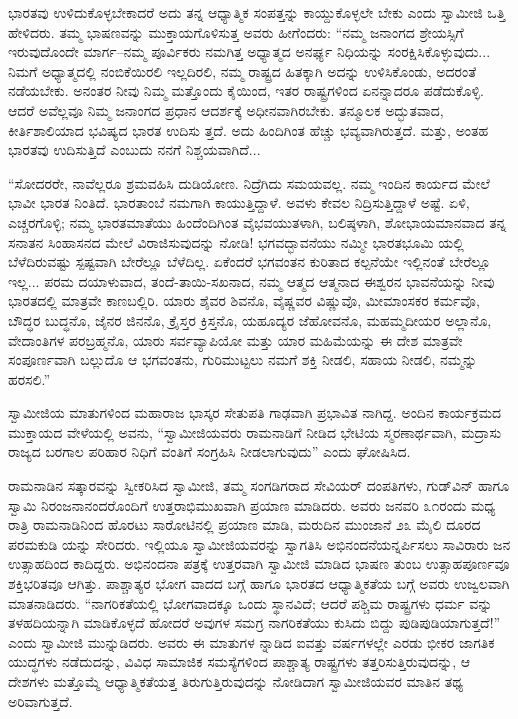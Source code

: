 ಭಾರತವು ಉಳಿದುಕೊಳ್ಳಬೇಕಾದರೆ ಅದು ತನ್ನ ಆಧ್ಯಾತ್ಮಿಕ ಸಂಪತ್ತನ್ನು ಕಾಯ್ದುಕೊಳ್ಳಲೇ ಬೇಕು ಎಂದು ಸ್ವಾಮೀಜಿ ಒತ್ತಿ ಹೇಳಿದರು. ತಮ್ಮ ಭಾಷಣವನ್ನು ಮುಕ್ತಾಯಗೊಳಿಸುತ್ತ ಅವರು ಹೀಗೆಂದರು: “ನಮ್ಮ ಜನಾಂಗದ ಶ್ರೇಯಸ್ಸಿಗೆ ಇರುವುದೊಂದೇ ಮಾರ್ಗ–ನಮ್ಮ ಪೂರ್ವಿಕರು ನಮಗಿತ್ತ ಅಧ್ಯಾತ್ಮದ ಅನರ್ಘ್ಯ ನಿಧಿಯನ್ನು ಸಂರಕ್ಷಿಸಿಕೊಳ್ಳುವುದು... ನಿಮಗೆ ಅಧ್ಯಾತ್ಮದಲ್ಲಿ ನಂಬಿಕೆಯಿರಲಿ ಇಲ್ಲದಿರಲಿ, ನಮ್ಮ ರಾಷ್ಟ್ರದ ಹಿತಕ್ಕಾಗಿ ಅದನ್ನು ಉಳಿಸಿಕೊಂಡು, ಅದರಂತೆ ನಡೆಯಬೇಕು. ಅನಂತರ ನೀವು ನಿಮ್ಮ ಮತ್ತೊಂದು ಕೈಯಿಂದ, ಇತರ ರಾಷ್ಟ್ರಗಳಿಂದ ಏನನ್ನಾದರೂ ಪಡೆದುಕೊಳ್ಳಿ. ಆದರೆ ಅವೆಲ್ಲವೂ ನಿಮ್ಮ ಜನಾಂಗದ ಪ್ರಧಾನ ಆದರ್ಶಕ್ಕೆ ಅಧೀನವಾಗಿರಬೇಕು. ತನ್ಮೂಲಕ ಅದ್ಭುತವಾದ, ಕೀರ್ತಿಶಾಲಿಯಾದ ಭವಿಷ್ಯದ ಭಾರತ ಉದಿಸು ತ್ತದೆ. ಅದು ಹಿಂದಿಗಿಂತ ಹೆಚ್ಚು ಭವ್ಯವಾಗಿರುತ್ತದೆ. ಮತ್ತು, ಅಂತಹ ಭಾರತವು ಉದಿಸುತ್ತಿದೆ ಎಂಬುದು ನನಗೆ ನಿಶ್ಚಯವಾಗಿದೆ... 

“ಸೋದರರೇ, ನಾವೆಲ್ಲರೂ ಶ್ರಮವಹಿಸಿ ದುಡಿಯೋಣ. ನಿದ್ರೆಗಿದು ಸಮಯವಲ್ಲ. ನಮ್ಮ ಇಂದಿನ ಕಾರ್ಯದ ಮೇಲೆ ಭಾವೀ ಭಾರತ ನಿಂತಿದೆ. ಭಾರತಾಂಬೆ ನಮಗಾಗಿ ಕಾಯುತ್ತಿದ್ದಾಳೆ. ಅವಳು ಕೇವಲ ನಿದ್ರಿಸುತ್ತಿದ್ದಾಳೆ ಅಷ್ಟೆ. ಏಳಿ, ಎಚ್ಚರಗೊಳ್ಳಿ; ನಮ್ಮ ಭಾರತಮಾತೆಯು ಹಿಂದೆಂದಿಗಿಂತ ವೈಭವಯುತಳಾಗಿ, ಬಲಿಷ್ಠಳಾಗಿ, ಶೋಭಾಯಮಾನವಾದ ತನ್ನ ಸನಾತನ ಸಿಂಹಾಸನದ ಮೇಲೆ ವಿರಾಜಿಸುವುದನ್ನು ನೋಡಿ! ಭಗವದ್ಭಾವನೆಯು ನಮ್ಮೀ ಭಾರತಭೂಮಿ ಯಲ್ಲಿ ಬೆಳೆದಿರುವಷ್ಟು ಸ್ಪಷ್ಟವಾಗಿ ಬೇರೆಲ್ಲೂ ಬೆಳೆದಿಲ್ಲ. ಏಕೆಂದರೆ ಭಗವಂತನ ಕುರಿತಾದ ಕಲ್ಪನೆಯೇ ಇಲ್ಲಿನಂತೆ ಬೇರೆಲ್ಲೂ ಇಲ್ಲ... ಪರಮ ದಯಾಳುವಾದ, ತಂದೆ-ತಾಯಿ-ಸಖನಾದ, ನಮ್ಮ ಆತ್ಮದ ಆತ್ಮನಾದ ಈಶ್ವರನ ಭಾವನೆಯನ್ನು ನೀವು ಭಾರತದಲ್ಲಿ ಮಾತ್ರವೇ ಕಾಣಬಲ್ಲಿರಿ. ಯಾರು ಶೈವರ ಶಿವನೊ, ವೈಷ್ಣವರ ವಿಷ್ಣುವೊ, ಮೀಮಾಂಸಕರ ಕರ್ಮವೊ, ಬೌದ್ಧರ ಬುದ್ಧನೊ, ಜೈನರ ಜಿನನೊ, ಕ್ರೈಸ್ತರ ಕ್ರಿಸ್ತನೊ, ಯಹೂದ್ಯರ ಜೆಹೋವನೊ, ಮಹಮ್ಮದೀಯರ ಅಲ್ಲಾನೊ, ವೇದಾಂತಿಗಳ ಪರಬ್ರಹ್ಮನೊ, ಯಾರು ಸರ್ವವ್ಯಾಪಿಯೋ ಮತ್ತು ಯಾರ ಮಹಿಮೆಯನ್ನು ಈ ದೇಶ ಮಾತ್ರವೇ ಸಂಪೂರ್ಣವಾಗಿ ಬಲ್ಲುದೊ ಆ ಭಗವಂತನು, ಗುರಿಮುಟ್ಟಲು ನಮಗೆ ಶಕ್ತಿ ನೀಡಲಿ, ಸಹಾಯ ನೀಡಲಿ, ನಮ್ಮನ್ನು ಹರಸಲಿ.”

ಸ್ವಾಮೀಜಿಯ ಮಾತುಗಳಿಂದ ಮಹಾರಾಜ ಭಾಸ್ಕರ ಸೇತುಪತಿ ಗಾಢವಾಗಿ ಪ್ರಭಾವಿತ ನಾಗಿದ್ದ. ಅಂದಿನ ಕಾರ್ಯಕ್ರಮದ ಮುಕ್ತಾಯದ ವೇಳೆಯಲ್ಲಿ ಅವನು, “ಸ್ವಾಮೀಜಿಯವರು ರಾಮನಾಡಿಗೆ ನೀಡಿದ ಭೇಟಿಯ ಸ್ಮರಣಾರ್ಥವಾಗಿ, ಮದ್ರಾಸು ರಾಜ್ಯದ ಬರಗಾಲ ಪರಿಹಾರ ನಿಧಿಗೆ ವಂತಿಗೆ ಸಂಗ್ರಹಿಸಿ ನೀಡಲಾಗುವುದು” ಎಂದು ಘೋಷಿಸಿದ.

ರಾಮನಾಡಿನ ಸತ್ಕಾರವನ್ನು ಸ್ವೀಕರಿಸಿದ ಸ್ವಾಮೀಜಿ, ತಮ್ಮ ಸಂಗಡಿಗರಾದ ಸೇವಿಯರ್ ದಂಪತಿಗಳು, ಗುಡ್​ವಿನ್ ಹಾಗೂ ಸ್ವಾಮಿ ನಿರಂಜನಾನಂದರೊಂದಿಗೆ ಉತ್ತರಾಭಿಮುಖವಾಗಿ ಪ್ರಯಾಣ ಮಾಡಿದರು. ಅವರು ಜನವರಿ ೩೧ರಂದು ಮಧ್ಯ ರಾತ್ರಿ ರಾಮನಾಡಿನಿಂದ ಹೊರಟು ಸಾರೋಟಿನಲ್ಲಿ ಪ್ರಯಾಣ ಮಾಡಿ, ಮರುದಿನ ಮುಂಜಾನೆ ೨೩ ಮೈಲಿ ದೂರದ ಪರಮಕುಡಿ ಯನ್ನು ಸೇರಿದರು. ಇಲ್ಲಿಯೂ ಸ್ವಾಮೀಜಿಯವರನ್ನು ಸ್ವಾಗತಿಸಿ ಅಭಿನಂದನೆಯನ್ನರ್ಪಿಸಲು ಸಾವಿರಾರು ಜನ ಉತ್ಸಾಹದಿಂದ ಕಾದಿದ್ದರು. ಅಭಿನಂದನಾ ಪತ್ರಕ್ಕೆ ಉತ್ತರವಾಗಿ ಸ್ವಾಮೀಜಿ ಮಾಡಿದ ಭಾಷಣ ತುಂಬ ಉತ್ಸಾಹಪೂರ್ಣವೂ ಶಕ್ತಿಭರಿತವೂ ಆಗಿತ್ತು. ಪಾಶ್ಚಾತ್ಯರ ಭೋಗ ವಾದದ ಬಗ್ಗೆ ಹಾಗೂ ಭಾರತದ ಆಧ್ಯಾತ್ಮಿಕತೆಯ ಬಗ್ಗೆ ಅವರು ಉಜ್ವಲವಾಗಿ ಮಾತನಾಡಿದರು. “ನಾಗರಿಕತೆಯಲ್ಲಿ ಭೋಗವಾದಕ್ಕೂ ಒಂದು ಸ್ಥಾನವಿದೆ; ಆದರೆ ಪಶ್ಚಿಮ ರಾಷ್ಟ್ರಗಳು ಧರ್ಮ ವನ್ನು ತಳಹದಿಯನ್ನಾಗಿ ಮಾಡಿಕೊಳ್ಳದೆ ಹೋದರೆ ಅವುಗಳ ಸಮಗ್ರ ನಾಗರಿಕತೆಯು ಕುಸಿದು ಬಿದ್ದು ಪುಡಿಪುಡಿಯಾಗುತ್ತದೆ!” ಎಂದು ಸ್ವಾಮೀಜಿ ಮುನ್ನುಡಿದರು. ಅವರು ಈ ಮಾತುಗಳ ನ್ನಾಡಿದ ಐವತ್ತು ವರ್ಷಗಳಲ್ಲೇ ಎರಡು ಭೀಕರ ಜಾಗತಿಕ ಯುದ್ಧಗಳು ನಡೆದುದನ್ನು, ವಿವಿಧ ಸಾಮಾಜಿಕ ಸಮಸ್ಯೆಗಳಿಂದ ಪಾಶ್ಚಾತ್ಯ ರಾಷ್ಟ್ರಗಳು ತತ್ತರಿಸುತ್ತಿರುವುದನ್ನು, ಆ ದೇಶಗಳು ಮತ್ತೊಮ್ಮೆ ಆಧ್ಯಾತ್ಮಿಕತೆಯತ್ತ ತಿರುಗುತ್ತಿರುವುದನ್ನು ನೋಡಿದಾಗ ಸ್ವಾಮೀಜಿಯವರ ಮಾತಿನ ತಥ್ಯ ಅರಿವಾಗುತ್ತದೆ.

